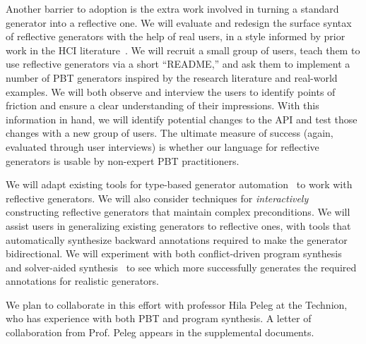 Another barrier to adoption is the extra work involved in turning a standard
generator into a reflective one.
We will evaluate and redesign the surface syntax of reflective generators with
the help of real users, in a style informed by prior work in the HCI
literature~\cite{ref:ko2015practical}.  We will recruit a small group of users, teach
them to use reflective generators via a short ``README,'' and ask
them to implement a number of PBT generators inspired by the research
literature and real-world examples. We will both observe and interview
the users to identify points of friction and ensure a clear understanding of their
impressions. With this information in hand, we will identify potential changes
to the API and test those changes with a new group of users.  The
ultimate measure of success (again, evaluated through user interviews)
is whether our language for reflective generators is usable by non-expert PBT
practitioners.

We will adapt existing tools for type-based generator
automation~\cite{mista2019deriving} to work with reflective generators.
We will also consider techniques for {\em interactively}
constructing reflective generators that maintain complex preconditions.
We will assist
users in generalizing existing generators to reflective ones, with tools that automatically synthesize backward annotations
required to make the generator bidirectional. We will experiment with both
conflict-driven program synthesis~\cite{feng_program_2018} and solver-aided
synthesis~\cite{torlak_growing_2013} to see which more successfully generates
the required annotations for realistic generators.

We plan to collaborate in this effort with professor Hila
Peleg at the Technion, who has experience with both PBT and program synthesis. A
letter of collaboration from Prof.{} Peleg appears in the supplemental documents.


